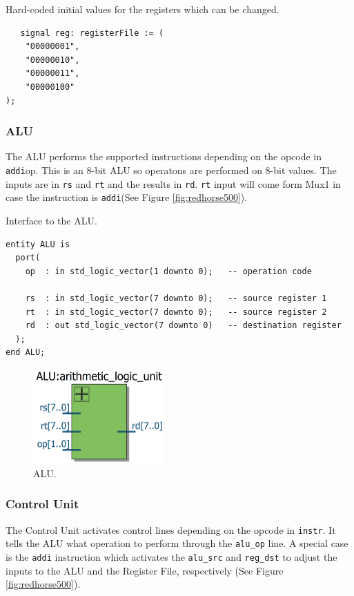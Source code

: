 \documentclass[a4paper, 11pt,oneside]{article}
\begin{document}
\begin{listing}[H]
\caption{Hard-coded initial values for the registers which can be changed.}
\label{code:rf_values}
\begin{verbatim}
   signal reg: registerFile := (
    "00000001",
    "00000010",
    "00000011",
    "00000100"
);
\end{verbatim}
\end{listing}

\subsubsection{ALU}
The ALU performs the supported instructions depending on the opcode in 
\texttt{addi}{op}. This is an 8-bit ALU so operatons are performed on 
8-bit values. The inputs are in \texttt{rs} and \texttt{rt} 
and the results in \texttt{rd}. \texttt{rt} input will come 
form Mux1 in case the instruction is \texttt{addi}(See Figure 
\ref{fig:redhorse500}).

\begin{listing}[H]
\caption{Interface to the ALU.}
\label{code:alu}
\begin{verbatim}
entity ALU is
  port(
    op  : in std_logic_vector(1 downto 0);   -- operation code

    rs  : in std_logic_vector(7 downto 0);   -- source register 1
    rt  : in std_logic_vector(7 downto 0);   -- source register 2
    rd  : out std_logic_vector(7 downto 0)   -- destination register
  );
end ALU;

\end{verbatim}
\end{listing}

\begin{figure}[H]
	\begin{center}
	\includegraphics[width=2in]{alu.png}
	\caption{ALU.}
	\label{fig:alu} 
	\end{center}
\end{figure}

\subsubsection{Control Unit}
The Control Unit activates control lines depending on the opcode in 
\texttt{instr}. It tells the ALU what operation to perform through 
the \texttt{alu_op} line. A special case is 
the \texttt{addi} instruction which activates the 
\texttt{alu_src} and \texttt{reg_dst} to adjust the 
inputs to the ALU and the Register File, respectively (See Figure 
\ref{fig:redhorse500}). 
\end{document}
